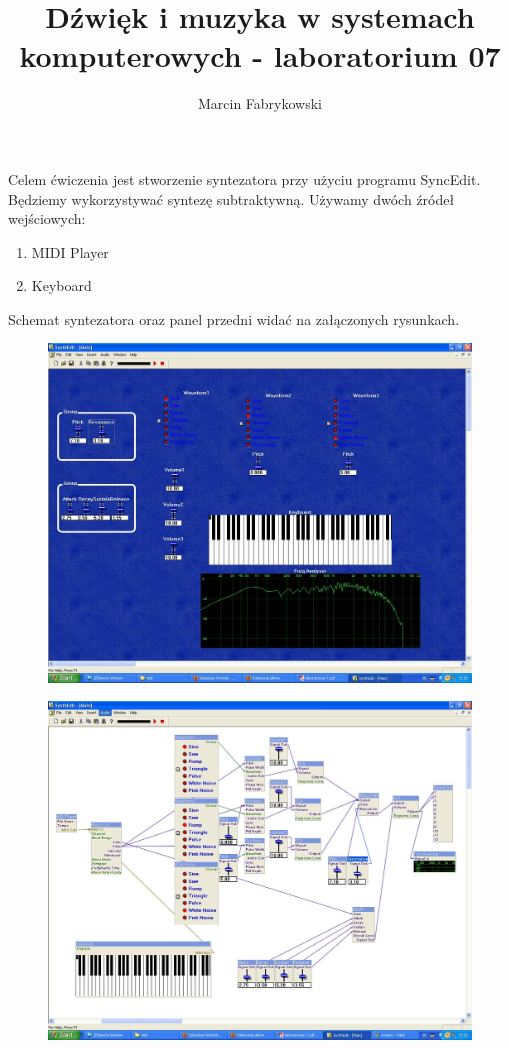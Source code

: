 \documentclass[10pt,a4paper]{article}
\title{Dźwięk i muzyka w systemach komputerowych - laboratorium 07}
\author{Marcin Fabrykowski}
\date{}
\begin{document}
\maketitle
\newpage
Celem ćwiczenia jest stworzenie syntezatora przy użyciu programu SyncEdit. Będziemy wykorzystywać syntezę subtraktywną. Używamy dwóch źródeł wejściowych:
\begin{enumerate}
\item MIDI Player
\item Keyboard
\end{enumerate}
Schemat syntezatora oraz panel przedni widać na załączonych rysunkach.
\begin{figure}
\hspace{-4cm}
\includegraphics[scale=0.6]{screen1.jpg}
\end{figure}
\begin{figure}
\hspace{-4cm}
\includegraphics[scale=0.6]{screen2.jpg}
\end{figure}
\end{document}
